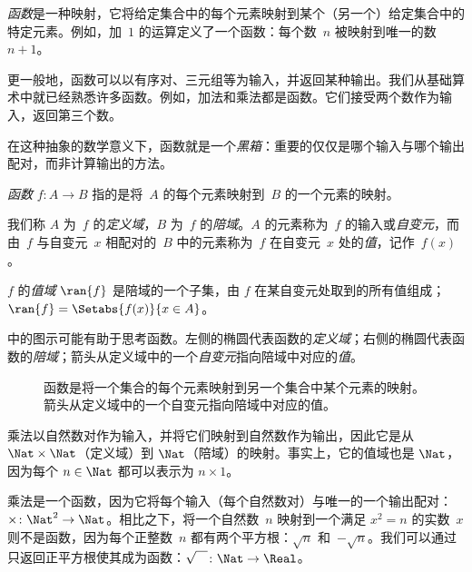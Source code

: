 \documentclass[../../../include/open-logic-section]{subfiles}
\begin{document}

\begin{explain}
\emph{函数}是一种映射，它将给定集合中的每个元素映射到某个（另一个）给定集合中的特定元素。例如，加~$1$ 的运算定义了一个函数：每个数~$n$ 被映射到唯一的数~$n+1$。

更一般地，函数可以以有序对、三元组等为输入，并返回某种输出。我们从基础算术中就已经熟悉许多函数。例如，加法和乘法都是函数。它们接受两个数作为输入，返回第三个数。

在这种抽象的数学意义下，函数就是一个\emph{黑箱}：重要的仅仅是哪个输入与哪个输出配对，而非计算输出的方法。
\end{explain}

\begin{defn}[函数]
\emph{函数} $f \colon A \to B$ 指的是将~$A$ 的每个元素映射到~$B$ 的一个元素的映射。

我们称 $A$ 为~$f$ 的\emph{定义域}，$B$ 为~$f$ 的\emph{陪域}。$A$ 的元素称为~$f$ 的输入或\emph{自变元}，而由~$f$ 与自变元~$x$ 相配对的~$B$ 中的元素称为~$f$ 在自变元~$x$ 处的\emph{值}，记作~$f(x)$。

$f$ 的\emph{值域} $\ran{f}$ 是陪域的一个子集，由 $f$ 在某自变元处取到的所有值组成；$\ran{f} =
\Setabs{f(x)}{x \in A}$。
\end{defn}

 中的图示可能有助于思考函数。左侧的椭圆代表函数的\emph{定义域}；右侧的椭圆代表函数的\emph{陪域}；箭头从定义域中的一个\emph{自变元}指向陪域中对应的\emph{值}。

\begin{figure}
  \caption{函数是将一个集合的每个元素映射到另一个集合中某个元素的映射。箭头从定义域中的一个自变元指向陪域中对应的值。}
\end{figure}

\begin{ex}
乘法以自然数对作为输入，并将它们映射到自然数作为输出，因此它是从 $\Nat \times \Nat$（定义域）到 $\Nat$（陪域）的映射。事实上，它的值域也是 $\Nat$，因为每个 $n \in \Nat$ 都可以表示为 $n \times 1$。
\end{ex}

\begin{ex}
乘法是一个函数，因为它将每个输入（每个自然数对）与唯一的一个输出配对：$\times \colon \Nat^2 \to \Nat$。相比之下，将一个自然数~$n$ 映射到一个满足 $x^2 = n$ 的实数~$x$ 则不是函数，因为每个正整数~$n$ 都有两个平方根：$\sqrt{n}$ 和~$-\sqrt{n}$。我们可以通过只返回正平方根使其成为函数：$\sqrt{\phantom{X}} \colon
\Nat \to \Real$。
\end{ex}
\end{document}
